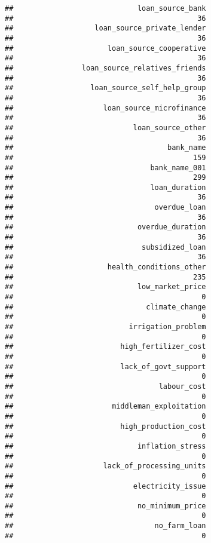 \documentclass[
]{article}
\begin{document}
\begin{verbatim}
##                             loan_source_bank 
##                                           36 
##                   loan_source_private_lender 
##                                           36 
##                      loan_source_cooperative 
##                                           36 
##                loan_source_relatives_friends 
##                                           36 
##                  loan_source_self_help_group 
##                                           36 
##                     loan_source_microfinance 
##                                           36 
##                            loan_source_other 
##                                           36 
##                                    bank_name 
##                                          159 
##                                bank_name_001 
##                                          299 
##                                loan_duration 
##                                           36 
##                                 overdue_loan 
##                                           36 
##                             overdue_duration 
##                                           36 
##                              subsidized_loan 
##                                           36 
##                      health_conditions_other 
##                                          235 
##                             low_market_price 
##                                            0 
##                               climate_change 
##                                            0 
##                           irrigation_problem 
##                                            0 
##                         high_fertilizer_cost 
##                                            0 
##                         lack_of_govt_support 
##                                            0 
##                                  labour_cost 
##                                            0 
##                       middleman_exploitation 
##                                            0 
##                         high_production_cost 
##                                            0 
##                             inflation_stress 
##                                            0 
##                     lack_of_processing_units 
##                                            0 
##                            electricity_issue 
##                                            0 
##                             no_minimum_price 
##                                            0 
##                                 no_farm_loan 
##                                            0 

\end{verbatim}
\end{document}
